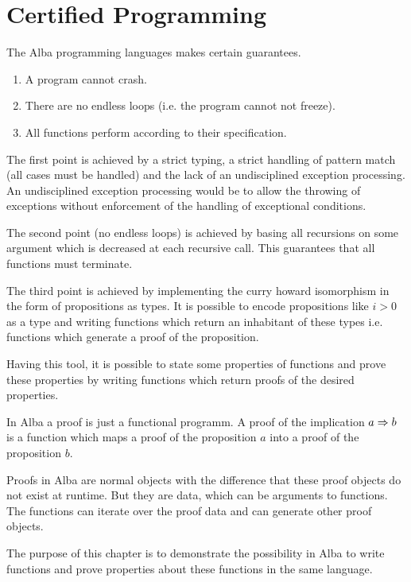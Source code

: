 
\chapter{Certified Programming}
\label{chap:certprog}

The Alba programming languages makes certain guarantees.
\begin{enumerate}
\item A program cannot crash.

\item There are no endless loops (i.e. the program cannot not freeze).

\item All functions perform according to their specification.
\end{enumerate}

The first point is achieved by a strict typing, a strict handling of pattern
match (all cases must be handled) and the lack of an undisciplined exception
processing. An undisciplined exception processing would be to allow the
throwing of exceptions without enforcement of the handling of exceptional
conditions.

The second point (no endless loops) is achieved by basing all recursions on
some argument which is decreased at each recursive call. This guarantees that
all functions must terminate.

The third point is achieved by implementing the curry howard isomorphism in
the form of propositions as types. It is possible to encode propositions like
$i > 0$ as a type and writing functions which return an inhabitant of these
types i.e. functions which generate a proof of the proposition.

Having this tool, it is possible to state some properties of functions and
prove these properties by writing functions which return proofs of the
desired properties.

In Alba a proof is just a functional programm. A proof of the implication $a
\Rightarrow b$ is a function which maps a proof of the proposition $a$ into a proof
of the proposition $b$.

Proofs in Alba are normal objects with the difference that these proof objects
do not exist at runtime. But they are data, which can be arguments to
functions. The functions can iterate over the proof data and can generate
other proof objects.

The purpose of this chapter is to demonstrate the possibility in Alba to write
functions and prove properties about these functions in the same language.




